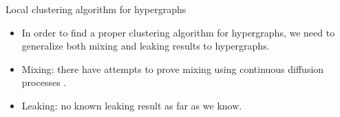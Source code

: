 \documentclass[../main.tex]{subfiles}
\begin{document}
    \begin{frame}{Local clustering algorithm for hypergraphs}
        \begin{itemize}
            \item In order to find a proper clustering algorithm for hypergraphs, we need to generalize both mixing and leaking results to hypergraphs. 
            \item Mixing: there have attempts to prove mixing using continuous diffusion processes \cite{Takai_2020}.
            \item Leaking: no known leaking result as far as we know.
        \end{itemize}
    \end{frame}
\end{document}
